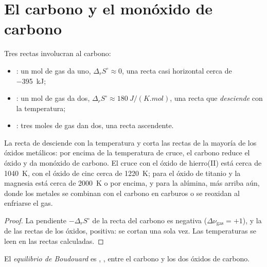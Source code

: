 \section{El carbono y el monóxido de carbono}

Tres rectas involucran al carbono:
\begin{itemize}
  \item {}: un mol de gas da uno, $\Delta_r S^\circ
        \approx 0$, una recta casi horizontal cerca de \qty{-395}{kJ};
  \item {}: un mol de gas da dos, $\Delta_r S^\circ
        \approx \qty{+180}{J/(K.mol)}$, una recta que \emph{desciende} con la temperatura;
  \item {}: tres moles de gas dan dos, una recta ascendente.
\end{itemize}

\begin{proposition}\label{prop:b2:ellingham:carbon}
La recta de  desciende con la temperatura y corta las
rectas de la mayoría de los óxidos metálicos: por encima de la temperatura de cruce, el carbono reduce el
óxido y da monóxido de carbono. El cruce con el óxido de hierro(II) está cerca de
\qty{1040}{K}, con el óxido de cinc cerca de \qty{1220}{K}; para el óxido de titanio y la magnesia
está cerca de \qty{2000}{K} o por encima, y para la alúmina, más arriba aún, donde los metales
se combinan con el carbono en carburos o se reoxidan al enfriarse el gas.
\end{proposition}

\begin{proof}
La pendiente $-\Delta_r S^\circ$ de la recta del carbono es negativa ($\Delta\nu_{\text{gas}}
= +1$), y la de las rectas de los óxidos, positiva: se cortan una sola vez. Las temperaturas
se leen en las rectas calculadas.
\end{proof}

\begin{definition}\label{def:b2:ellingham:boudouard}
El \emph{equilibrio de Boudouard} es ,
, entre el carbono y los dos óxidos de carbono.
\end{definition}

